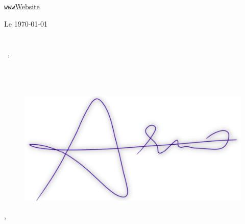 \documentclass[16pt]{letter}
\begin{document}

\begin{center}
\large
\textcolor{lpkl}{
\href{http://veletanlic.org}{\texttt{www}\enspace Website}\hfill
\href{mailto:\myemail}{\faEnvelope\enspace \myemail}\hfill
\href{tel:\myphone}{\faPhone\enspace \myphone}\hfill
\faMapMarker\enspace \href{https://goo.gl/maps/TG1BjiwrtCYisynV9}{\mylocation}
}
\end{center}
\vspace{2cm}

\textcolor{pp}{\Large Le \today}\\
\\\\
\textcolor{pp}{\large\greeting\ \recipient,}\\

\vspace{-0.1in}\setlength\parindent{24pt}
\noindent\\\\\\

\begin{figure}
    \vspace{-3cm}\includegraphics[width=0.3\paperwidth]{Signature-purple-thin.png}
\end{figure}
\begin{flushright}
\textcolor{pp}{\large\closer,}
\end{flushright}
\begin{flushright}
\textcolor{pp}{\large\myname}
\end{flushright}
\begin{flushright}
\textcolor{pp}{\mytitle}
\end{flushright}
\end{document}
